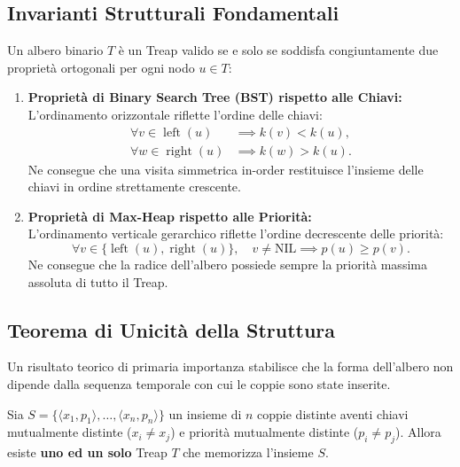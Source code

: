 \subsection{Invarianti Strutturali Fondamentali}
Un albero binario $T$ \`e un Treap valido se e solo se soddisfa congiuntamente due propriet\`a ortogonali per ogni nodo $u \in T$:

\begin{enumerate}
    \item \textbf{Propriet\`a di Binary Search Tree (BST) rispetto alle Chiavi:}\\
    L'ordinamento orizzontale riflette l'ordine delle chiavi:
    \begin{align}
      \forall v \in \operatorname{left}(u)  &\implies k(v) < k(u), \\
      \forall w \in \operatorname{right}(u) &\implies k(w) > k(u).
    \end{align}
    Ne consegue che una visita simmetrica in-order restituisce l'insieme delle chiavi in ordine strettamente crescente.

    \item \textbf{Propriet\`a di Max-Heap rispetto alle Priorit\`a:}\\
    L'ordinamento verticale gerarchico riflette l'ordine decrescente delle priorit\`a:
    \begin{equation}
      \forall v \in \{\operatorname{left}(u), \operatorname{right}(u)\}, \quad v \neq \text{NIL} \implies p(u) \ge p(v).
    \end{equation}
    Ne consegue che la radice dell'albero possiede sempre la priorit\`a massima assoluta di tutto il Treap.
\end{enumerate}

\subsection{Teorema di Unicit\`a della Struttura}
Un risultato teorico di primaria importanza stabilisce che la forma dell'albero non dipende dalla sequenza temporale con cui le coppie sono state inserite.

\begin{theorem}
\label{thm:treap-uniqueness}
Sia $S = \{ \langle x_1, p_1 \rangle, \dots, \langle x_n, p_n \rangle \}$ un insieme di $n$ coppie distinte aventi chiavi mutualmente distinte ($x_i \neq x_j$) e priorit\`a mutualmente distinte ($p_i \neq p_j$). Allora esiste \textbf{uno ed un solo} Treap $T$ che memorizza l'insieme $S$.
\end{theorem}

